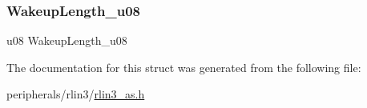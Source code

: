 \subsubsection{\texorpdfstring{Wakeup\+Length\+\_\+u08}{WakeupLength\_u08}}
{\footnotesize\ttfamily u08 Wakeup\+Length\+\_\+u08}



The documentation for this struct was generated from the following file\+:\begin{DoxyCompactItemize}
\item 
peripherals/rlin3/\mbox{\hyperlink{rlin3__as_8h}{rlin3\+\_\+as.\+h}}\end{DoxyCompactItemize}
